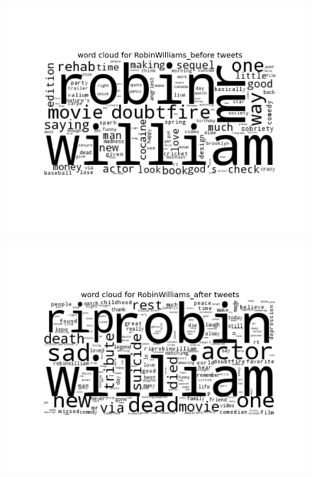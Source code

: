 \documentclass[11pt, oneside]{article}   	%
\begin{document}
 \begin{figure}
 \includegraphics[width=\textwidth]{../figures/RobinWilliams_before.png}
 \centering
 \end{figure}

 \begin{figure}
 \includegraphics[width=\textwidth]{../figures/RobinWilliams_after.png}
 \centering
 \end{figure}
\end{document}
